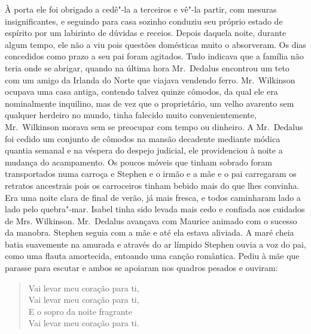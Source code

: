 À porta ele foi obrigado a cedê"-la a terceiros e vê"-la partir, com mesuras
insignificantes, e seguindo para casa sozinho conduziu seu próprio estado de
espírito por um labirinto de dúvidas e receios.  Depois daquela noite, durante
algum tempo, ele não a viu pois questões domésticas muito o absorveram.  Os
dias concedidos como prazo a seu pai foram agitados.  Tudo indicava que a
família não teria onde se abrigar, quando na última hora Mr.~Dedalus encontrou
um teto com um amigo da Irlanda do Norte que \mbox{viajava} vendendo ferro.  
Mr.~Wilkinson ocupava uma casa antiga, contendo talvez quinze cômodos, da qual ele
era nominalmente inquilino, mas de vez que o proprietário, um velho avarento sem
qualquer herdeiro no mundo, tinha falecido muito convenientemente, 
Mr.~Wilkinson morava sem se preocupar com tempo ou dinheiro.  A Mr.~Dedalus foi
cedido um conjunto de cômodos na mansão decadente mediante módica quantia
semanal e na véspera do despejo judicial, ele providenciou à noite a mudança do
acampamento.  Os poucos móveis que tinham sobrado foram transportados numa
\label{carroca} carroça e Stephen e o irmão e a mãe e o pai carregaram os \mbox{retratos} ancestrais
pois os carroceiros tinham bebido mais do que lhes convinha.  Era uma noite
clara de final de verão, já mais fresca, e todos caminharam lado a lado pelo
quebra"-mar.  Isabel tinha sido levada mais cedo e confiada aos cuidados de Mrs.
Wilkinson.  Mr.~Dedalus avançava com Maurice animado com o sucesso da manobra.
Stephen seguia com a mãe e até ela estava aliviada.  A maré cheia batia
suavemente na amurada e através do ar límpido Stephen ouvia a voz do pai, como
uma flauta amortecida, entoando uma canção romântica.  Pediu à mãe que parasse
para escutar e ambos se apoiaram nos quadros pesados e ouviram:

\begin{verse}
Vai levar meu coração para ti,\\
Vai levar meu coração para ti,\\
E o sopro da noite fragrante\\
Vai levar meu coração para ti.
\end{verse}

